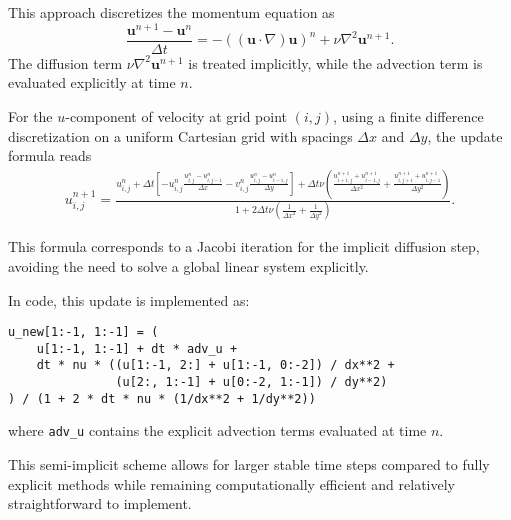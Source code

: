 This approach discretizes the momentum equation as
\begin{equation}
\frac{\mathbf{u}^{n+1} - \mathbf{u}^n}{\Delta t} = - \left( (\mathbf{u} \cdot \nabla) \mathbf{u} \right)^n + \nu \nabla^2 \mathbf{u}^{n+1}.
\end{equation}
The diffusion term $\nu \nabla^2 \mathbf{u}^{n+1}$ is treated implicitly, while the advection term is evaluated explicitly at time $n$.

For the $u$-component of velocity at grid point $(i,j)$, using a finite difference discretization on a uniform Cartesian grid with spacings $\Delta x$ and $\Delta y$, the update formula reads
\begin{equation}
\begin{aligned}
u_{i,j}^{n+1} = \frac{
u_{i,j}^n + \Delta t \left[
- u_{i,j}^n \frac{u_{i,j}^n - u_{i,j-1}^n}{\Delta x}
- v_{i,j}^n \frac{u_{i,j}^n - u_{i-1,j}^n}{\Delta y}
\right] + \Delta t \nu \left(
\frac{u_{i+1,j}^{n+1} + u_{i-1,j}^{n+1}}{\Delta x^2} + \frac{u_{i,j+1}^{n+1} + u_{i,j-1}^{n+1}}{\Delta y^2}
\right)
}{
1 + 2 \Delta t \nu \left( \frac{1}{\Delta x^2} + \frac{1}{\Delta y^2} \right)
}.
\end{aligned}
\end{equation}

This formula corresponds to a Jacobi iteration for the implicit diffusion step, avoiding the need to solve a global linear system explicitly.

In code, this update is implemented as:
\begin{verbatim}
u_new[1:-1, 1:-1] = (
    u[1:-1, 1:-1] + dt * adv_u +
    dt * nu * ((u[1:-1, 2:] + u[1:-1, 0:-2]) / dx**2 +
               (u[2:, 1:-1] + u[0:-2, 1:-1]) / dy**2)
) / (1 + 2 * dt * nu * (1/dx**2 + 1/dy**2))
\end{verbatim}
where \texttt{adv\_u} contains the explicit advection terms evaluated at time $n$.

This semi-implicit scheme allows for larger stable time steps compared to fully explicit methods while remaining computationally efficient and relatively straightforward to implement.

